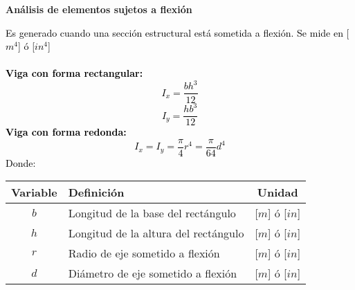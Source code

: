 \documentclass[letterpaper,11pt]{extarticle}
\newcommand{\mybox}[2]
{
    \begin{tcolorbox}[colback=color!5!white,colframe=color!75!black,boxsep=1pt,arc=0pt,outer arc=0pt,title={\textcolor{white}{#1}}]
        \textcolor{black}{#2}
    \end{tcolorbox}
}
\begin{document}
    \newpage

    \begin{center} \textbf{Análisis de elementos sujetos a flexión} \end{center}
    \begin{multicols}{2}
        \mybox{Momento de inercia ($I$):}
        {
            Es generado cuando una sección estructural está sometida a flexión. Se mide en [$m^4$] ó [$in^4$] \\\\
            \textbf{Viga con forma rectangular:}
            \begin{equation}
                I_x = \frac{bh^3}{12}
            \end{equation}
            \begin{equation}
                I_y = \frac{hb^3}{12}
            \end{equation}
            \textbf{Viga con forma redonda:}
            \begin{equation}
                I_x = I_y = \frac{\pi}{4}r^4 = \frac{\pi}{64}d^4
            \end{equation}
            Donde:
            \begin{center}
                \begin{tabular}{ c | p{35mm} | c }
                    \hline Variable & Definición & Unidad \\ \hline 
                    $b$ & Longitud de la base del rectángulo & [$m$] ó [$in$]\\
                    $h$ & Longitud de la altura del rectángulo & [$m$] ó [$in$]\\
                    $r$ & Radio de eje sometido a flexión & [$m$] ó [$in$]\\
                    $d$ & Diámetro de eje sometido a flexión & [$m$] ó [$in$]\\ \hline
                \end{tabular}
            \end{center}
        }


\end{multicols}
\end{document}
